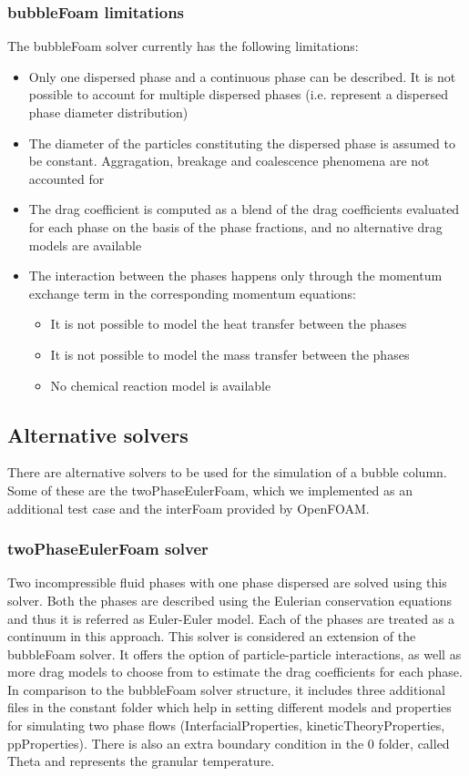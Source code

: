 \documentclass[11pt, a4paper, twoside]{article}
\begin{document}
\subsubsection{bubbleFoam limitations} \label{sec:bubbleFoamlimitations}
The bubbleFoam solver currently has the following limitations:

\begin{itemize}
    \item{Only one dispersed phase and a continuous phase can be described. It is not possible to account for multiple dispersed phases (i.e. represent a dispersed phase diameter distribution)}
    \item{The diameter of the particles constituting the dispersed phase is assumed to be constant. Aggragation, breakage and coalescence phenomena are not accounted for}
    \item{The drag coefficient is computed as a blend of the drag coefficients evaluated for each phase on the basis of the phase fractions, and no alternative drag models are available}
    \item{The interaction between the phases happens only through the momentum exchange term in the corresponding momentum equations:}
    \begin{itemize}
        \item{It is not possible to model the heat transfer between the phases}
        \item{It is not possible to model the mass transfer between the phases}
        \item{No chemical reaction model is available}
        \end{itemize}
\end{itemize}

\subsection{Alternative solvers}
There are alternative solvers to be used for the simulation of a bubble column. Some of these are the twoPhaseEulerFoam, which we implemented as an additional test case and the interFoam provided by OpenFOAM.

\subsubsection{twoPhaseEulerFoam solver}
Two incompressible fluid phases with one phase dispersed are solved using this solver. Both the phases are described using the Eulerian conservation equations and thus it is referred  as  Euler-Euler model. Each of the phases are treated as a continuum in this approach. This solver is considered an extension of the bubbleFoam solver. It offers the option of particle-particle interactions, as well as more drag models to choose from to estimate the drag coefficients for each phase.
In comparison to the bubbleFoam solver structure, it includes three additional files in the constant folder which help in setting different models and properties for simulating two phase flows (InterfacialProperties, kineticTheoryProperties, ppProperties). There is also an extra boundary condition in the 0 folder, called Theta and represents the granular temperature. 
\end{document}
